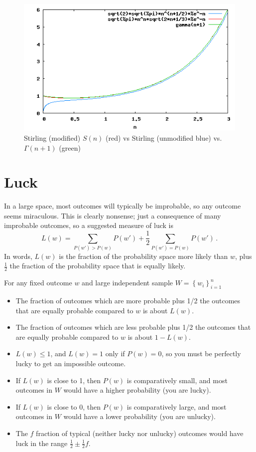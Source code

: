 \documentclass{article}
\begin{document}
\begin{figure}
  \caption{Stirling (modified) $S(n)$ (red) vs Stirling (unmodified blue) vs. $\Gamma(n+1)$ (green)}
  \centering
    \includegraphics[width=1.0\textwidth]{img/stirling}
\end{figure}

\section{Luck}
In a large space, most outcomes will typically be improbable, so any outcome seems miraculous.  This is clearly nonsense; just a consequence of many improbable outcomes, so a suggested measure of luck is
\begin{equation}
\label{eq:luck}
L(w) = \sum_{P(w') > P(w)} P(w') + \frac{1}{2} \sum_{P(w') = P(w)} P(w') \,.
\end{equation}
In words, $L(w)$ is the fraction of the probability space more likely than $w$, plus $\frac{1}{2}$ the fraction of the probability space that is equally likely.  

For any fixed outcome $w$ and large independent sample $W=\left\{w_i\right\}_{i=1}^{n}$
\begin{itemize}
\item The fraction of outcomes which are more probable plus 1/2 the outcomes that are equally probable compared to $w$ is about $L(w)$.
\item The fraction of outcomes which are less probable plus 1/2 the outcomes that are equally probable compared to $w$ is about $1-L(w)$.
\item $L(w) \leq 1$, and $L(w)=1$ only if $P(w)=0$, so you must be perfectly lucky to get an impossible outcome.
\item If $L(w)$ is close to 1, then $P(w)$ is comparatively small, and most outcomes in $W$ would have a higher probability (you are lucky).  
\item If $L(w)$ is close to 0, then $P(w)$ is comparatively large, and most outcomes in $W$ would have a lower probability (you are unlucky).
\item The $f$ fraction of typical (neither lucky nor unlucky) outcomes would have luck in the range $\frac{1}{2} \pm \frac{1}{2}f$. 
\end{itemize}
\end{document}
